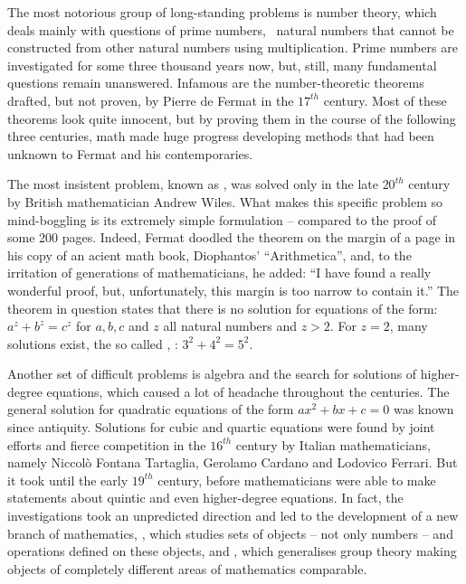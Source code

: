 \documentclass{scrreprt}
\begin{document}
The most notorious group of long-standing problems 
is number theory, which deals mainly with
questions of prime numbers, \ie\ natural numbers
that cannot be constructed from other natural numbers
using multiplication.
Prime numbers are investigated for some three thousand years now,
but, still, many fundamental questions remain unanswered.
Infamous are the number-theoretic theorems drafted,
but not proven, by Pierre de Fermat in the $17^{th}$ century.
Most of these theorems look quite innocent, 
but by proving them in the course of the following three centuries,
math made huge progress developing methods 
that had been unknown to Fermat and his contemporaries.

The most insistent problem, known 
as , was solved only
in the late $20^{th}$ century
by British mathematician Andrew Wiles.
What makes this specific problem so mind-boggling
is its extremely simple formulation -- compared to the
proof of some 200 pages. 
Indeed, Fermat doodled the theorem
on the margin of a page in his copy of an acient math book,
Diophantos' ``Arithmetica'', and, 
to the irritation of generations of mathematicians,
he added: ``I have found a really wonderful proof,
but, unfortunately,
this margin is too narrow to contain it.''
The theorem in question states
that there is no solution for 
equations of the form: $a^z + b^z = c^z$
for $a,b,c$ and $z$ all natural numbers and $z > 2$.
For $z = 2$, many solutions exist,
the so called ,
\eg: $3^2 + 4^2= 5^2$.

Another set of difficult problems is algebra
and the search for solutions of
higher-degree equations, which
caused a lot of headache throughout the centuries.
The general solution for quadratic equations
of the form $ax^2 + bx + c = 0$
was known since antiquity.
Solutions for cubic and quartic equations
were found by joint efforts and fierce
competition in the $16^{th}$ century by Italian mathematicians,
namely Niccolò Fontana Tartaglia, 
Gerolamo Cardano and Lodovico Ferrari. 
But it took until the early $19^{th}$ century,
before mathematicians were able to make statements
about quintic and even higher-degree equations.
In fact, the investigations took an unpredicted direction
and led to the development of a new branch of mathematics,
, 
which studies sets of objects -- not only numbers --
and operations defined on these objects,
and ,
which generalises group theory 
making objects of completely different areas of mathematics comparable.
\end{document}
